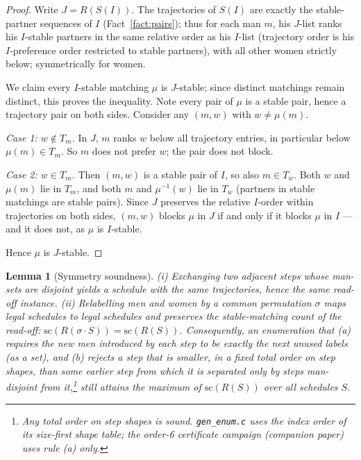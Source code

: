 \documentclass[11pt]{article}
\newtheorem{lemma}{Lemma}
\begin{document}
\begin{proof}
Write $J=R(S(I))$. The trajectories of $S(I)$ are exactly the stable-partner sequences
of $I$ (Fact~\ref{fact:pairs}); thus for each man $m$, his $J$-list ranks his $I$-stable
partners in the same relative order as his $I$-list (trajectory order is his
$I$-preference order restricted to stable partners), with all other women strictly
below; symmetrically for women.

We claim every $I$-stable matching $\mu$ is $J$-stable; since distinct matchings remain
distinct, this proves the inequality. Note every pair of $\mu$ is a stable pair, hence
a trajectory pair on both sides. Consider any $(m,w)$ with $w\ne\mu(m)$.

\emph{Case 1: $w\notin T_m$.} In $J$, $m$ ranks $w$ below all trajectory entries, in
particular below $\mu(m)\in T_m$. So $m$ does not prefer $w$; the pair does not block.

\emph{Case 2: $w\in T_m$.} Then $(m,w)$ is a stable pair of $I$, so also $m\in T_w$.
Both $w$ and $\mu(m)$ lie in $T_m$, and both $m$ and $\mu^{-1}(w)$ lie in $T_w$
(partners in stable matchings are stable pairs). Since $J$ preserves the relative
$I$-order within trajectories on both sides, $(m,w)$ blocks $\mu$ in $J$ if and only
if it blocks $\mu$ in $I$ --- and it does not, as $\mu$ is $I$-stable.

Hence $\mu$ is $J$-stable.
\end{proof}

\begin{lemma}[Symmetry soundness]\label{lem:sym}
(i) Exchanging two adjacent steps whose man-sets are disjoint yields a schedule with
the same trajectories, hence the same read-off instance.
(ii) Relabelling men and women by a common permutation $\sigma$ maps legal schedules to
legal schedules and preserves the stable-matching count of the read-off:
$\mathrm{sc}(R(\sigma\cdot S))=\mathrm{sc}(R(S))$.
Consequently, an enumeration that (a) requires the new men introduced by each step to
be exactly the next unused labels (as a set), and (b) rejects a step that is smaller, in
a fixed total order on step shapes, than some earlier step from which it is separated
only by steps man-disjoint from it,\footnote{Any total order on step shapes is sound.
\texttt{gen\_enum.c} uses the index order of its size-first shape table; the order-6
certificate campaign (companion paper) uses rule (a) only.} still attains the maximum of
$\mathrm{sc}(R(S))$ over all schedules $S$.
\end{lemma}
\end{document}
